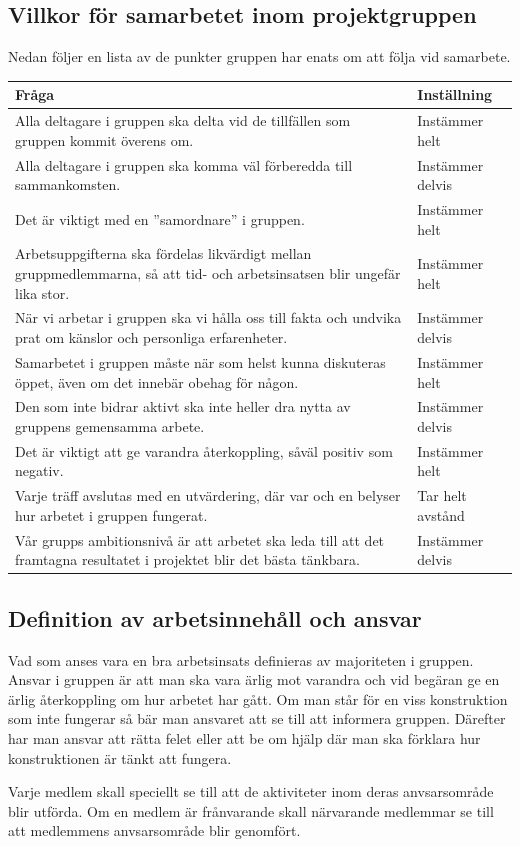 \documentclass[projektplan/plan.tex]{subfiles}
\begin{document}
\noindent
\begin{minipage}{\textwidth}
\subsection{Villkor för samarbetet inom projektgruppen}
\label{sec:doc}
Nedan följer en lista av de punkter gruppen har enats om att följa vid samarbete.
{\renewcommand{\arraystretch}{1.6}
\begin{longtable}{p{}p{}}
    \bfseries Fråga &
    \bfseries Inställning \\\hline
    Alla deltagare i gruppen ska delta vid de tillfällen som gruppen kommit
    överens om. &
    Instämmer helt
    \\
    Alla deltagare i gruppen ska komma väl förberedda till sammankomsten. &
    Instämmer delvis
    \\
    Det är viktigt med en ”samordnare” i gruppen. &
    Instämmer helt
    \\
    Arbetsuppgifterna ska fördelas likvärdigt mellan gruppmedlemmarna, så att
    tid- och arbetsinsatsen blir ungefär lika stor. &
    Instämmer helt
    \\
    När vi arbetar i gruppen ska vi hålla oss till fakta och undvika prat om
    känslor och personliga erfarenheter. &
    Instämmer delvis
    \\
    Samarbetet i gruppen måste när som helst kunna diskuteras öppet, även om
    det innebär obehag för någon. &
    Instämmer helt
    \\
    Den som inte bidrar aktivt ska inte heller dra nytta av gruppens gemensamma
    arbete. &
    Instämmer delvis
    \\
    Det är viktigt att ge varandra återkoppling, såväl positiv som negativ. &
    Instämmer helt
    \\
    Varje träff avslutas med en utvärdering, där var och en belyser hur arbetet
    i gruppen fungerat. &
    Tar helt avstånd
    \\
    Vår grupps ambitionsnivå är att arbetet ska leda till att det framtagna
    resultatet i projektet blir det bästa tänkbara. &
    Instämmer delvis
    \\
\end{longtable}}
\end{minipage}

\noindent

\subsection{Definition av arbetsinnehåll och ansvar}
Vad som anses vara en bra arbetsinsats definieras av majoriteten i gruppen.
Ansvar i gruppen är att man ska vara ärlig mot varandra och vid begäran ge en
ärlig återkoppling om hur arbetet har gått. Om man står för en viss
konstruktion som inte fungerar så bär man ansvaret att se till att informera
gruppen. Därefter har man ansvar att rätta felet eller att be om hjälp där man
ska förklara hur konstruktionen är tänkt att fungera.

Varje medlem skall speciellt se till att de aktiviteter inom deras
anvsarsområde blir utförda. Om en medlem är frånvarande skall närvarande
medlemmar se till att medlemmens anvsarsområde blir genomfört.
\end{document}
